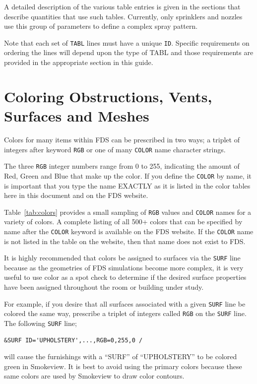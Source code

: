 \documentclass[11pt]{book}
\newcommand{\ct}{\tt\small}
\begin{document}
\noindent
A detailed description of the various table entries is given in the sections that describe quantities that use such
tables. Currently, only sprinklers and nozzles use this group of parameters to define a complex spray pattern.

\begin{warning}
\noindent
Note that each set of {\ct TABL} lines must have a unique {\ct ID}.  Specific requirements on ordering the lines
will depend upon the type of TABL and those requirements are provided in the appropriate section in this guide.
\end{warning}


\clearpage

\section{Coloring Obstructions, Vents, Surfaces and Meshes}
\label{info:colors}
Colors for many items within FDS can be prescribed in two ways; a triplet of
integers after keyword {\ct RGB} or one of many {\ct COLOR} name character strings.

The three {\ct RGB} integer numbers range from 0 to 255, indicating the amount of Red, Green and Blue
that make up the color. If you define the {\ct COLOR} by name, it is important that you type the name EXACTLY as it
is listed in the color tables here in this document and on the FDS website.

Table~\ref{tab:colors} provides a small sampling of {\ct RGB} values and {\ct COLOR} names
for a variety of colors. A complete listing of all 500+ colors that can be
specified by name after the {\ct COLOR} keyword is available on the FDS website.
If the {\ct COLOR} name is not listed in the table on the website, then that name does not exist to FDS.

It is highly recommended that colors be assigned to surfaces via the {\ct SURF} line because as
the geometries of FDS simulations become more complex, it is very useful
to use color as a spot check to determine if the desired
surface properties have been assigned throughout the room or building under study.

For example, if you desire that all surfaces associated with a
given {\ct SURF} line be colored the same way, prescribe a triplet of
integers called {\ct RGB} on the {\ct SURF} line. The following {\ct SURF} line;
\footnotesize
\begin{verbatim}
&SURF ID='UPHOLSTERY',...,RGB=0,255,0 /
\end{verbatim}
\normalsize
will cause the furnishings with a ``SURF'' of ``UPHOLSTERY'' to be colored green in Smokeview.
It is best to avoid using the primary colors because these same colors are
used by Smokeview to draw color contours.
\end{document}
